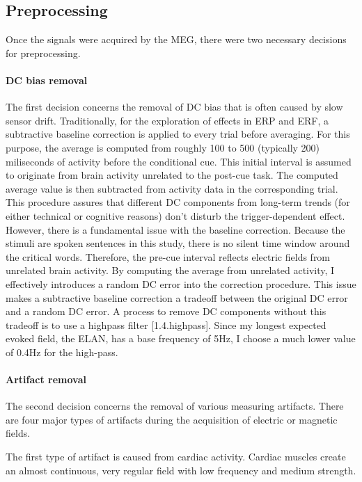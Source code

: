 \subsection{Preprocessing}

Once the signals were acquired by the MEG, there were two necessary decisions for preprocessing.

\paragraph{DC bias removal}
The first decision concerns the removal of DC bias that is often caused by slow sensor drift.
Traditionally, for the exploration of effects in ERP and ERF, a subtractive baseline correction is applied to every trial before averaging.
For this purpose, the average is computed from roughly 100 to 500 (typically 200) miliseconds of activity before the conditional cue.
This initial interval is assumed to originate from brain activity unrelated to the post-cue task.
The computed average value is then subtracted from activity data in the corresponding trial.
This procedure assures that different DC components from long-term trends (for either technical or cognitive reasons) don't disturb the trigger-dependent effect.
However, there is a fundamental issue with the baseline correction.
Because the stimuli are spoken sentences in this study, there is no silent time window around the critical words.
Therefore, the pre-cue interval reflects electric fields from unrelated brain activity.
By computing the average from unrelated activity, I effectively introduces a random DC error into the correction procedure.
This issue makes a subtractive baseline correction a tradeoff between the original DC error and a random DC error.
A process to remove DC components without this tradeoff is to use a highpass filter [1.4.highpass].
Since my longest expected evoked field, the ELAN, has a base frequency of 5Hz, I choose a much lower value of 0.4Hz for the high-pass.

\paragraph{Artifact removal}
The second decision concerns the removal of various measuring artifacts.
There are four major types of artifacts during the acquisition of electric or magnetic fields.

The first type of artifact is caused from cardiac activity.
Cardiac muscles create an almost continuous, very regular field with low frequency and medium strength.

